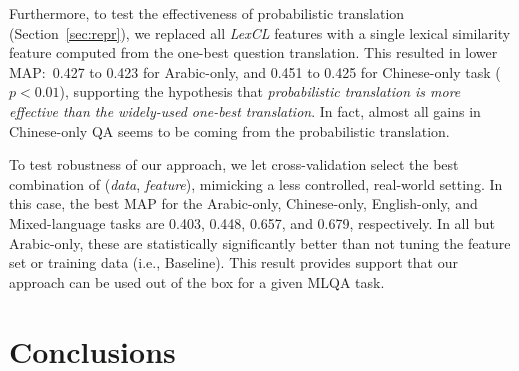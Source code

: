 \documentclass{sig-alternate-05-2015}
\begin{document}
Furthermore, to test the effectiveness of probabilistic translation (Section~\ref{sec:repr}), we replaced all 
{\em LexCL} features with a single lexical similarity feature computed from the one-best question translation. 
This resulted in lower MAP:\ 0.427 to 0.423 for Arabic-only, and 0.451 to 0.425 for Chinese-only task ($p < 0.01$), 
supporting the hypothesis that \emph{probabilistic translation is more effective than the widely-used 
one-best translation}. In fact, almost all gains in Chinese-only QA seems to be coming from the
probabilistic translation.

To test robustness of our approach, we let cross-validation select the best combination of 
(\emph{data}, \emph{feature}), mimicking a less controlled, real-world setting. In this case, the best 
MAP for the Arabic-only, Chinese-only, English-only, and Mixed-language tasks are 0.403, 0.448, 0.657, and 
0.679, respectively. In all but Arabic-only, these are statistically significantly better than 
not tuning the feature set or training data (i.e., Baseline). This result provides support that our approach
can be used out of the box for a given MLQA task.

\section{Conclusions}\label{sec:concl}
%
%
\end{document}
